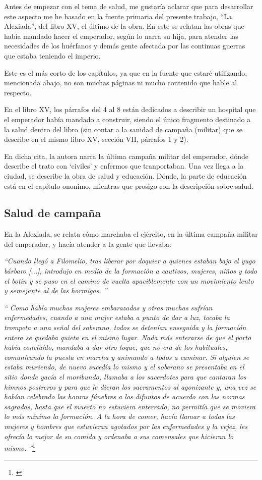 
Antes de empezar con el tema de salud, me gustaría aclarar que
para desarrollar este aspecto me he basado en
la fuente primaria del 
presente trabajo, “La Alexiada”, del libro XV, el último de la obra. 
En este se relatan
las obras que había mandado hacer el emperador, 
según lo narra su hija, para atender las necesidades de
los huérfanos y demás gente afectada 
por las continuas guerras que estaba teniendo el imperio.

Este es el más corto de los capítulos, ya que en la fuente
que estaré utilizando, mencionada abajo, no son muchas
páginas ni mucho contenido que hable al respecto.

En el libro XV, los párrafos del 4 al 8 están dedicados a 
describir un hospital que el emperador había mandado a construir, 
siendo el único fragmento destinado a la salud dentro del libro 
(sin contar a la sanidad de campaña (militar) que se describe 
en el mismo libro XV, sección VII, párrafos 1 y 2).

En dicha cita, la autora narra la última campaña militar
del emperador, dónde describe el trato con `civiles' y
enfermos que tranportaban. Una vez llega a la ciudad,
se describe la obra de salud y educación.
Dónde, la parte de educación está en el capítulo ononimo,
mientras que prosigo con la descripción sobre salud.

\subsection{Salud de campaña}
En la Alexiada, se relata cómo marchaba el ejército, en la
última campaña militar del emperador, y hacía atender
a la gente que llevaba:

\textit{``Cuando llegó a Filomelio, tras liberar por doquier
	a quienes estaban bajo el yugo bárbaro [...], introdujo
	en medio de la formación a cautivos, mujeres, niños y
	todo el botín y se puso en el camino de vuelta apaciblemente
	con un movimiento lento y semejante al de las hormigas.
	''}

\textit{``
	Como había muchas mujeres embarazadas y otras muchas sufrían
	enfermedades, cuando a una mujer estaba a punto de dar a luz,
	tocaba la trompeta a una señal del soberano, todos se detenían
	enseguida y la formación entera se quedaba quieta en el mismo
	lugar. Nada más enterarse de que el parto había concluido,
	mandaba a dar otro toque, que no era de los habituales,
	comunicando la puesta en marcha y animando a todos a caminar.
	Si alguien se estaba muriendo, de nuevo sucedía lo mismo y el
	soberano se presentaba en el sitio donde yacía el moribundo,
	llamaba a los sacerdotes para que cantaran los himnos postreros
	y para que le dieran los sacramentos al agonizante y, una vez se
	habían celebrado las honras fúnebres a los difuntos de acuerdo
	con las normas sagradas, hasta que el muerto no estuviera enterrado,
	no permitía que se moviera lo más mínimo la formación. A la hora de comer,
	hacía llamar a todas las mujeres y hombres que estuvieran agotados
	por las enfermedades y la vejez, les ofrecía lo mejor de su comida
	y ordenaba a sus comensales que hicieran lo mismo.
	''}\footnote{\cite[pp.~604--605]{alexiadaXV}}

